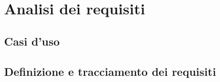 \chapter{Analisi dei requisiti}
\label{cap:analisi-requisiti}


\setlength{\parskip}{3ex}

\section{Casi d'uso}


\section{Definizione e tracciamento dei requisiti}


